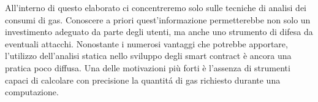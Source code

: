 \indent All'interno di questo elaborato ci concentreremo solo sulle tecniche di analisi dei consumi di gas. Conoscere a priori quest'informazione permetterebbe non solo un investimento adeguato da parte degli utenti, ma anche uno strumento di difesa da eventuali attacchi.\newline
\indent Nonostante i numerosi vantaggi che potrebbe apportare, l'utilizzo dell'analisi statica nello sviluppo degli smart contract è ancora una pratica poco diffusa. Una delle motivazioni più forti è l'assenza di strumenti capaci di calcolare con precisione la quantitá di gas richiesto durante una computazione. 
